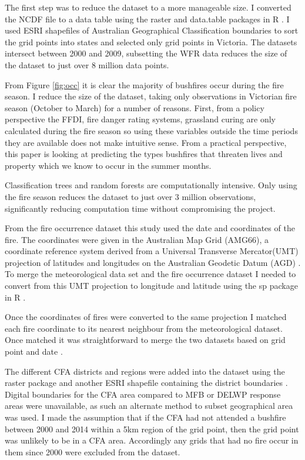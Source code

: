 \documentclass[11pt,a4paper]{article}
\begin{document}
The first step was to reduce the dataset to a more manageable size. I converted the NCDF file to a data table using the raster and data.table packages in R \citep{raster, datatable}. I used ESRI shapefiles of Australian Geographical Classification boundaries \citep{ABS1259} to sort the grid points into states and selected only grid points in Victoria. The datasets intersect between 2000 and 2009, subsetting the WFR data reduces the size of the dataset to just over 8 million data points. 

From Figure \ref{fig:occ} it is clear the majority of bushfires occur during the fire season. I reduce the size of the dataset, taking only observations in Victorian fire season (October to March) for a number of reasons. First, from a policy perspective the FFDI, fire danger rating systems, grassland curing are only calculated during the fire season so using these variables outside the time periods they are available does not make intuitive sense. From a practical perspective, this paper is looking at predicting the types bushfires that threaten lives and property which we know to occur in the summer months. 

Classification trees and random forests are computationally intensive. Only using the fire season reduces the dataset to just over 3 million observations, significantly reducing computation time without compromising the project. 

From the fire occurrence dataset this study used the date and coordinates of the fire. The coordinates were given in the Australian Map Grid (AMG66), a coordinate reference system derived from a Universal Transverse Mercator(UMT) projection of latitudes and longitudes on the Australian Geodetic Datum (AGD) \citep{featherstone96}. To merge the meteorological data set and the fire occurrence dataset I needed to convert from this UMT projection to longitude and latitude using the sp package in R \citep{sp08}. 

Once the coordinates of fires were converted to the same projection I matched each fire coordinate to its nearest neighbour from the meteorological dataset. Once matched it was straightforward to merge the two datasets based on grid point and date \citep{datatable}. 

The different CFA districts and regions were added into the dataset using the raster package and another ESRI shapefile containing the district boundaries \citep{raster}. 
Digital boundaries for the CFA area compared to MFB or DELWP response areas were unavailable, as such an alternate method to subset geographical area was used. I made the assumption that if the CFA had not attended a bushfire between 2000 and 2014 within a 5km region of the grid point, then the grid point was unlikely to be in a CFA area. Accordingly any grids that had no fire occur in them since 2000 were excluded from the dataset. 
\end{document}

